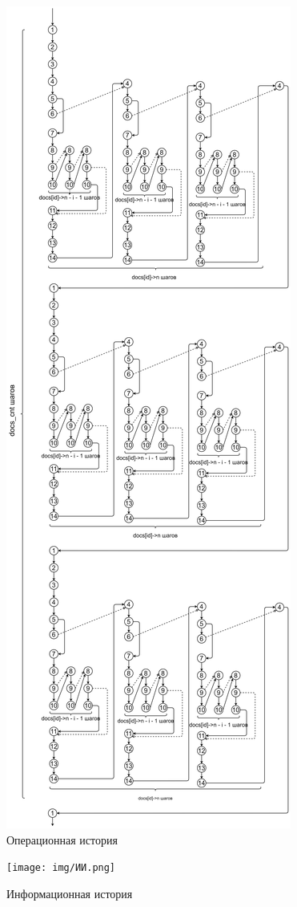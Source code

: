 \begin{figure}[h]
	\centering
	\includegraphics[height=0.95\textheight]{img/ОИ.png}
	\caption{Операционная история}
	\label{fig:g3}
\end{figure}

\begin{figure}[h]
	\centering
	\texttt{[image: img/ИИ.png]}
	\caption{Информационная история}
	\label{fig:g34}
\end{figure}

